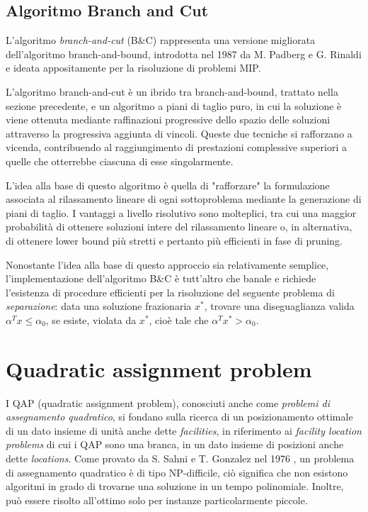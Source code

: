 \subsection{Algoritmo Branch and Cut}
L'algoritmo \textit{branch-and-cut} (B\&C) rappresenta una versione migliorata dell'algoritmo branch-and-bound, introdotta nel 1987
da M. Padberg e G. Rinaldi \cite{PADBERG19871} e ideata appositamente per la risoluzione di problemi MIP. 

L'algoritmo branch-and-cut è un ibrido tra branch-and-bound, trattato nella sezione precedente, e un algoritmo
a piani di taglio puro, in cui la soluzione è viene ottenuta mediante raffinazioni progressive dello spazio delle soluzioni attraverso la
progressiva aggiunta di vincoli.
Queste due tecniche si rafforzano a vicenda, contribuendo al raggiungimento di prestazioni complessive superiori a quelle
che otterrebbe ciascuna di esse singolarmente.

L'idea alla base di questo algoritmo è quella di "rafforzare" la formulazione associata al rilassamento lineare di ogni sottoproblema 
mediante la generazione di piani di taglio. I vantaggi a livello risolutivo sono molteplici, tra cui una maggior probabilità di
ottenere soluzioni intere del rilassamento lineare o, in alternativa, di ottenere lower bound più stretti e pertanto più efficienti in 
fase di pruning. 

Nonostante l'idea alla base di questo approccio sia relativamente semplice, l'implementazione dell'algoritmo B\&C è tutt'altro che
banale e richiede l'esistenza di procedure efficienti per la risoluzione del seguente problema di \textsl{separazione}: data una
soluzione frazionaria {$x^*$}, trovare una diseguaglianza valida $\alpha^Tx\leq \alpha_0$, se esiste, violata da $x^*$, cioè
tale che $\alpha^Tx^*>\alpha_0$.

\section{Quadratic assignment problem}
I QAP (quadratic assignment problem), conosciuti anche come \textit{problemi di assegnamento quadratico}, si fondano sulla ricerca
di un posizionamento ottimale di un dato insieme di unità anche dette \textit{facilities}, in riferimento ai \textit{facility location problems}
di cui i QAP sono una branca, in un dato insieme di posizioni anche dette \textit{locations}. 
Come provato da S. Sahni e T. Gonzalez nel 1976 \cite{SAHNI1976}, un problema di assegnamento quadratico è di tipo NP-difficile, 
ciò significa che non esistono algoritmi in grado di trovarne una soluzione in un tempo polinomiale. 
Inoltre, può essere risolto all'ottimo solo per instanze particolarmente piccole.

